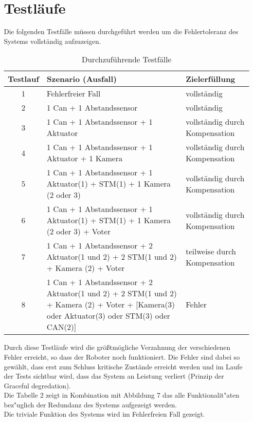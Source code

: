 \section{Testläufe}
\label{Testlaeufe}
Die folgenden Testfälle müssen durchgeführt werden um die Fehlertoleranz des Systems vollständig aufzuzeigen.
\begin{table}[H]
\centering
\begin{tabular}{|c|p{9cm}|p{5.5cm}|}
\hline 
Testlauf & Szenario (Ausfall) & Zielerfüllung\\ 
\hline
1 & Fehlerfreier Fall & vollständig\\ 
\hline 
2 & 1 Can + 1 Abstandssensor & vollständig\\ 
\hline 
3 & 1 Can + 1 Abstandssensor + 1 Aktuator & vollständig durch Kompensation\\ 
\hline 
4 & 1 Can + 1 Abstandssensor + 1 Aktuator + 1 Kamera & vollständig durch Kompensation\\ 
\hline 
5 & 1 Can + 1 Abstandssensor + 1 Aktuator(1) + STM(1) + 1 Kamera (2 oder 3) & vollständig durch Kompensation\\ 
\hline 
6 & 1 Can + 1 Abstandssensor + 1 Aktuator(1) + STM(1) + 1 Kamera (2 oder 3) + Voter & vollständig durch Kompensation\\ 
\hline 
7 & 1 Can + 1 Abstandssensor + 2 Aktuator(1 und 2) + 2 STM(1 und 2) + Kamera (2) + Voter & teilweise durch Kompensation\\ 
\hline 
8 & 1 Can + 1 Abstandssensor + 2 Aktuator(1 und 2) + 2 STM(1 und 2) + Kamera (2) + Voter + [Kamera(3) oder Aktuator(3) oder STM(3) oder CAN(2)] & Fehler\\ 
\hline 
\hline 
\end{tabular} 
\caption{Durchzuführende Testfälle}
\label{tab:testlaeufe}
\end{table}
Durch diese Testläufe wird die größtmögliche Verzahnung der verschiedenen Fehler erreicht, so dass der Roboter noch funktioniert. Die Fehler sind dabei so gewählt, dass erst zum Schluss kritische Zustände erreicht werden und im Laufe der Tests sichtbar wird, dass das System an Leistung verliert (Prinzip der Graceful degredation).\\
Die Tabelle 2 zeigt in Kombination mit Abbildung 7 das alle Funktionalit"aten bez"uglich der Redundanz des Systems aufgezeigt werden.\\
Die triviale Funktion des Systems wird im Fehlerfreien Fall gezeigt.